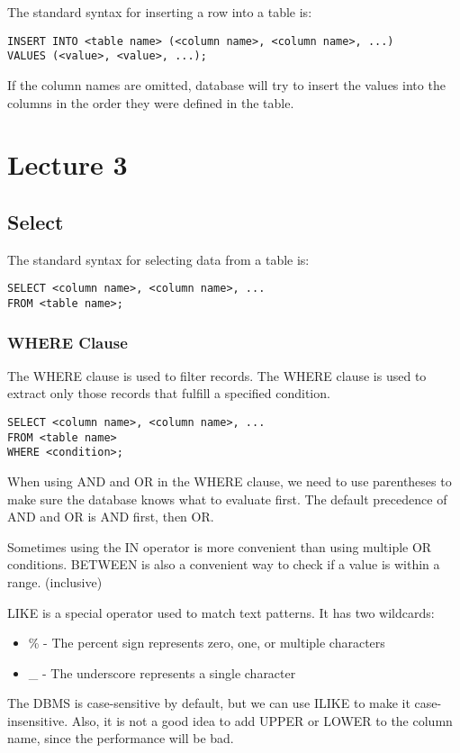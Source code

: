 \documentclass[a4paper,12pt]{article}
\begin{document}
The standard syntax for inserting a row into a table is:
\begin{verbatim}
INSERT INTO <table name> (<column name>, <column name>, ...)
VALUES (<value>, <value>, ...);
\end{verbatim}

If the column names are omitted, database will try to insert the values into the columns in the order they were defined in the table.

\section{Lecture 3}

\subsection{Select}

The standard syntax for selecting data from a table is:
\begin{verbatim}
SELECT <column name>, <column name>, ...
FROM <table name>;
\end{verbatim}

\subsubsection{WHERE Clause}

The WHERE clause is used to filter records.
The WHERE clause is used to extract only those records that fulfill a specified condition.
\begin{verbatim}
SELECT <column name>, <column name>, ...
FROM <table name>
WHERE <condition>;
\end{verbatim}

When using AND and OR in the WHERE clause, we need to use parentheses to make sure the database knows what to evaluate first.
The default precedence of AND and OR is AND first, then OR.

Sometimes using the IN operator is more convenient than using multiple OR conditions.
BETWEEN is also a convenient way to check if a value is within a range. (inclusive)

LIKE is a special operator used to match text patterns.
It has two wildcards:
\begin{itemize}
	\item \% - The percent sign represents zero, one, or multiple characters
	\item \_ - The underscore represents a single character
\end{itemize}
The DBMS is case-sensitive by default, but we can use ILIKE to make it case-insensitive.
Also, it is not a good idea to add UPPER or LOWER to the column name, since the performance will be bad.
\end{document}
